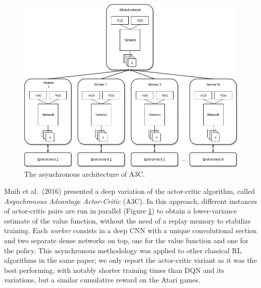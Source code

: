%
%
\begin{figure}
    \includegraphics[width=\textwidth]{pictures/a3c}
    \centering
    \caption[The asynchronous architecture of A3C]{The asynchronous architecture
	    of A3C.}
    \label{f:a3c}
\end{figure}
%
Mnih et al.\ (2016) \cite{mnih2016asynchronous} presented a deep variation of 
the actor-critic algorithm, called \textit{Asynchronous Advantage Actor-Critic} 
(A3C). In this approach, different instances of actor-critic pairs are run in 
parallel (Figure \ref{f:a3c}) to obtain a lower-variance estimate of the value 
function, without the need of a replay memory to stabilize training. 
Each \textit{worker} consists in a deep CNN with a unique convolutional section 
and two separate dense networks on top, one for the value function and one for 
the policy. 
This asynchronous methodology was applied to other classical RL algorithms in 
the same paper; we only report the actor-critic variant as it was the best 
performing, with notably shorter training times than DQN and its variations, but
a similar cumulative reward on the Atari games.

